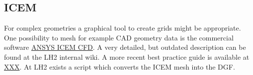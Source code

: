 \subsection{ICEM}
For complex geometries a graphical tool to create grids might be appropriate. One possibility to mesh for example CAD
geometry data is the commercial software \href{http://www.ansys.com/Products/Other+Products/ANSYS+ICEM+CFD/}{ANSYS ICEM
CFD}. A very detailed, but outdated description can be found at the LH2 internal wiki. A more recent best practice guide is available at
\url{XXX}. At LH2 exists a script which converts the ICEM mesh into the DGF.
